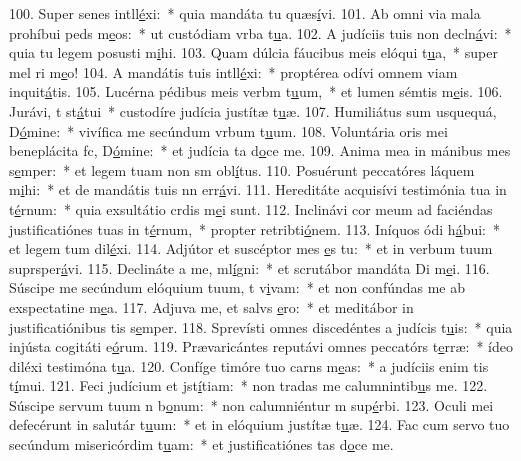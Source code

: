 100. Super senes intll\uline{é}xi:~* quia mandáta tu quæs\uline{í}vi.
101. Ab omni via mala prohíbui peds m\uline{e}os:~* ut custódiam vrba t\uline{u}a.
102. A judíciis tuis non decln\uline{á}vi:~* quia tu legem posusti m\uline{i}hi.
103. Quam dúlcia fáucibus meis elóqui t\uline{u}a,~* super mel ri m\uline{e}o!
104. A mandátis tuis intll\uline{é}xi:~* proptérea odívi omnem viam inquit\uline{á}tis.
105. Lucérna pédibus meis verbm t\uline{u}um,~* et lumen sémtis m\uline{e}is.
106. Jurávi, t st\uline{á}tui~* custodíre judícia justítæ t\uline{u}æ.
107. Humiliátus sum usquequá, D\uline{ó}mine:~* vivífica me secúndum vrbum t\uline{u}um.
108. Voluntária oris mei beneplácita fc, D\uline{ó}mine:~* et judícia ta d\uline{o}ce me.
109. Anima mea in mánibus mes s\uline{e}mper:~* et legem tuam non sm obl\uline{í}tus.
110. Posuérunt peccatóres láquem m\uline{i}hi:~* et de mandátis tuis nn err\uline{á}vi.
111. Hereditáte acquisívi testimónia tua in t\uline{é}rnum:~* quia exsultátio crdis m\uline{e}i sunt.
112. Inclinávi cor meum ad faciéndas justificatiónes tuas in t\uline{é}rnum,~* propter retribti\uline{ó}nem.
113. Iníquos ódi h\uline{á}bui:~* et legem tum dil\uline{é}xi.
114. Adjútor et suscéptor mes \uline{e}s tu:~* et in verbum tuum suprsper\uline{á}vi.
115. Declináte a me, ml\uline{í}gni:~* et scrutábor mandáta Di m\uline{e}i.
116. Súscipe me secúndum elóquium tuum, t v\uline{i}vam:~* et non confúndas me ab exspectatine m\uline{e}a.
117. Adjuva me, et salvs \uline{e}ro:~* et meditábor in justificatiónibus tis s\uline{e}mper.
118. Sprevísti omnes discedéntes a judícis t\uline{u}is:~* quia injústa cogitáti e\uline{ó}rum.
119. Prævaricántes reputávi omnes peccatórs t\uline{e}rræ:~* ídeo diléxi testimóna t\uline{u}a.
120. Confíge timóre tuo carns m\uline{e}as:~* a judíciis enim tis t\uline{í}mui.
121. Feci judícium et jst\uline{í}tiam:~* non tradas me calumnintib\uline{u}s me.
122. Súscipe servum tuum n b\uline{o}num:~* non calumniéntur m sup\uline{é}rbi.
123. Oculi mei defecérunt in salutár t\uline{u}um:~* et in elóquium justítæ t\uline{u}æ.
124. Fac cum servo tuo secúndum misericórdim t\uline{u}am:~* et justificatiónes tas d\uline{o}ce me.
